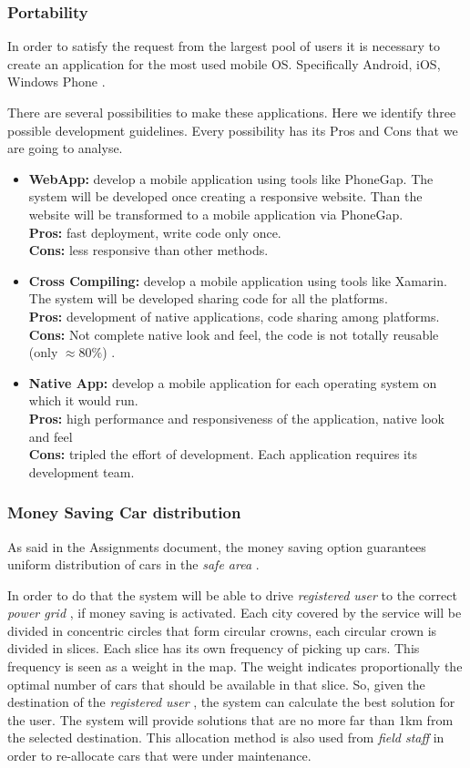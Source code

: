 \documentclass[english]{article}
\newcommand{\registereduser}{\textit {registered user }}
\newcommand{\safearea}{\textit{safe area }}
\newcommand{\powergrid}{\textit{power grid }}
\newcommand{\fieldstaff}{\textit{field staff }}
\begin{document}
		\subsubsection{Portability}
		In order to satisfy the request from the largest pool of users it is necessary to create an application for the most used mobile OS. Specifically Android\textregistered, iOS\textregistered, Windows Phone \textregistered. 
\par There are several possibilities to make these applications. Here we identify three possible development guidelines. Every possibility has its Pros and Cons that we are going to analyse.
		\begin{itemize}
			\item \textbf{WebApp:} develop a mobile application using tools like PhoneGap\textregistered. The system will be developed once creating a responsive website. Than the website will be transformed to a mobile application via PhoneGap. \\\textbf{Pros:} fast deployment, write code only once. \\\textbf{Cons:} less responsive than other methods.
			\item \textbf{Cross Compiling:} develop a mobile application using tools like Xamarin\textregistered. The system will be developed sharing code for all the platforms.\\\textbf{Pros:} development of native applications, code sharing among platforms. \\\textbf{Cons: } Not complete native look and feel, the code is not totally reusable (only $\approx 80\%$) .
			\item \textbf{Native App:} develop a mobile application for each operating system on which it would run. \\\textbf{Pros:} high performance and responsiveness of the application, native look and feel\\\textbf{Cons:} tripled the effort of development. Each application requires its development team.
		\end{itemize}		
		\subsubsection{Money Saving Car distribution}
		As said in the Assignments document, the money saving option guarantees uniform distribution of cars in the \safearea.\par In order to do that the system will be able to drive \registereduser to the correct \powergrid, if money saving is activated. Each city covered by the service will be divided in concentric circles that form circular crowns, each circular crown is divided in slices. Each slice has its own frequency of picking up cars. This frequency is seen as a weight in the map. The weight indicates proportionally the optimal number of cars that should be available in that slice. So, given the destination of the \registereduser, the system can calculate the best solution for the user.
The system will provide solutions that are no more far than 1km from the selected destination.
This allocation method is also used from \fieldstaff in order to re-allocate cars that were under maintenance.
		
\end{document}
